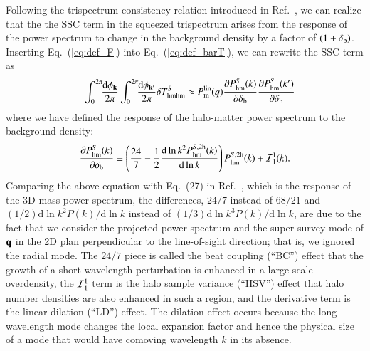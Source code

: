\documentclass[onecolumn,notitlepage,showpacs,amsmath,amssymb,prd,floatfix]{revtex4-1}
\newcommand{\bk}{{\bf k}}
\newcommand{\bq}{{\bf q}}
\newcommand{\dr}{\mathrm{d}}
\newcommand{\deltab}{\delta_{\rm b}}
\newcommand{\phm}{P_{\mathrm{hm}}}
\newcommand{\pml}{P^{\rm lin}_{\rm m}}
\begin{document}
Following the trispectrum consistency relation introduced in
Ref.~\cite{TakadaHu:13}, we can realize that the the SSC term in the
squeezed trispectrum arises from the response of the power spectrum to
change in the background density by a factor of $(1+\deltab)$.
Inserting Eq.~(\ref{eq:def_F}) into Eq.~(\ref{eq:def_barT}), we can
rewrite the SSC term as 
%
\begin{eqnarray}
&& \int_0^{2\pi}\!\!\frac{\dr\phi_\bk}{2\pi}
\int_0^{2\pi}\!\!\frac{\dr\phi_{\bk'}}{2\pi}\delta T^S_{\rm hmhm}
 \approx
\pml(q)\frac{\partial \phm^S(k)}{\partial \deltab}\frac{\partial \phm^S(k')}{\partial \deltab}
\end{eqnarray}
%
where we have defined the response of the halo-matter power spectrum to
the background density:
%
\begin{equation}
 \frac{\partial \phm^S(k)}{\partial \deltab}\equiv 
  \left(\frac{24}{7}-\frac{1}{2}\frac{\dr\ln k^2\phm^{S,{\rm
   2h}}(k)}{\dr \ln k}\right)\phm^{S,{\rm 2h}}(k) + {\cal I}^1_1(k).
\end{equation}
%
Comparing the above equation with Eq.~(27) in Ref.~\cite{Lietal:14a},
which is the response of the 3D mass power spectrum, the differences,
$24/7$ instead of $68/21$ and $(1/2)\dr\ln k^2P(k)/\dr \ln k$ instead of
$(1/3)\dr\ln k^3P(k)/\dr \ln k$, are due to the fact that we consider
the projected power spectrum and the super-survey mode of $\bq$ in the
2D plan perpendicular to the line-of-sight direction; that is, we
ignored the radial mode.  The $24/7$ piece is called the beat coupling
(``BC'') effect \cite{Hamiltonetal:06} that the growth of a short
wavelength perturbation is enhanced in a large scale overdensity, the
${\cal I}^1_1$ term is the halo sample variance (``HSV'') effect
\cite{TakadaBridle:07,Satoetal:09} that halo number densities are also
enhanced in such a region, and the derivative term is the linear
dilation (``LD'') effect. The dilation effect occurs because the long
wavelength mode changes the local expansion factor and hence the
physical size of a mode that would have comoving wavelength $k$ in its
absence.
\end{document}
